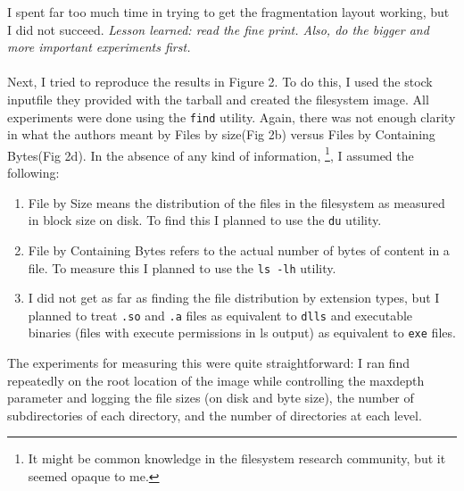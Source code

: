 I spent far too much time in trying to get the fragmentation layout working, but I did not succeed. \emph{Lesson learned: read the fine print. Also, do the bigger and more important experiments first.}\\\\
Next, I tried to reproduce the results in Figure 2. To do this, I used the stock inputfile they provided with the tarball and created the filesystem image. All experiments were done using the \texttt{find} utility. Again, there was not enough clarity in what the authors meant by Files by size(Fig 2b) versus Files by Containing Bytes(Fig 2d). In the absence of any kind of information, \footnote{It might be common knowledge in the filesystem research community, but it seemed opaque to me.}, I assumed the following:
\begin{enumerate}
    \item File by Size means the distribution of the files in the filesystem as measured in block size on disk. To find this I planned to use the \texttt{du} utility.
    \item File by Containing Bytes refers to the actual number of bytes of content in a file. To measure this I planned to use the \texttt{ls -lh} utility.
    \item I did not get as far as finding the file distribution by extension types, but I planned to treat \texttt{.so} and \texttt{.a} files as  equivalent to \texttt{dlls} and executable binaries (files with execute permissions in ls output) as equivalent to \texttt{exe} files. 
\end{enumerate}

The experiments for measuring this were quite straightforward: I ran find repeatedly on the root location of the image while controlling the maxdepth parameter and logging the file sizes (on disk and byte size), the number of subdirectories of each directory, and the number of directories at each level.
